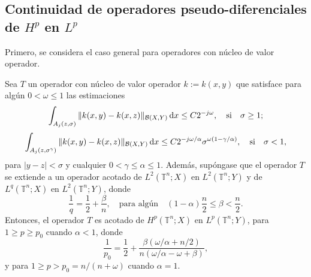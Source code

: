 \subsection{Continuidad de operadores pseudo-diferenciales de $H^p$ en $L^p$}
\label{section:Hp-Lp}
Primero, se considera el caso general para operadores con núcleo de valor operador. 
\begin{theorem}
	\label{theo:operator-kernel-2j}
	Sea $T$ un operador con núcleo de valor operador $k:=k(x,y)$ que satisface para algún $0<\omega\leq1$ las estimaciones
	\begin{equation}
		\int_{A_j(z, \sigma)} \| k(x, y) - k(x, z)\|_{\mathcal{B}(X, Y)} \mathop{}\!\mathrm{d} x \leq C2^{-j\omega}, \quad \text{si} \quad \sigma\geq1;
	\end{equation}
	\begin{equation}
		\int_{A_j(z, \sigma^\gamma)} \| k(x, y) - k(x, z)\|_{\mathcal{B}(X,Y)} \mathop{}\!\mathrm{d} x \leq C2^{-j\omega/\alpha}\sigma^{\omega(1-\gamma/\alpha)}, \quad \text{si} \quad \sigma<1,
	\end{equation}
	para $|y-z|<\sigma$ y cualquier $0<\gamma\leq\alpha\leq1$. Además, supóngase que el operador $T$ se extiende a un operador acotado de $L^2(\mathbb{T}^n; X)$ en $L^2(\mathbb{T}^n; Y)$ y de $L^q(\mathbb{T}^n; X)$ en $L^2(\mathbb{T}^n; Y)$, donde 
	\begin{equation}
		\frac{1}{q} = \frac{1}{2} + \frac{\beta}{n}, \quad \text{para algún} \quad (1-\alpha)\frac{n}{2} \leq \beta < \frac{n}{2}.
	\end{equation}
	Entonces, el operador $T$ es acotado de $H^p(\mathbb{T}^n; X)$ en $L^p(\mathbb{T}^n;Y)$, para $1\geq p \geq p_0$ cuando $\alpha<1$, donde
	\begin{equation*}
		\frac{1}{p_0} = \frac{1}{2}+\frac{\beta(\omega/\alpha + n/2)}{n(\omega/\alpha-\omega+\beta)},
	\end{equation*}  
	y para $1\geq p > p_0=n/(n+\omega)$ cuando $\alpha=1$.
\end{theorem}

